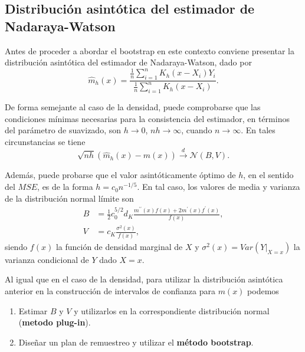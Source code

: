 \documentclass[
]{book}
\theoremstyle{break}
\theoremstyle{definition}
\theoremstyle{definition}
\theoremstyle{definition}
\theoremstyle{definition}
\theoremstyle{remark}
\begin{document}
\hypertarget{distribuciuxf3n-asintuxf3tica-del-estimador-de-nadaraya-watson}{%
\subsection{Distribución asintótica del estimador de Nadaraya-Watson}\label{distribuciuxf3n-asintuxf3tica-del-estimador-de-nadaraya-watson}}

Antes de proceder a abordar el bootstrap en este contexto conviene
presentar la distribución asintótica del estimador de Nadaraya-Watson,
dado por
\[\hat{m}_{h}\left( x \right) =\frac{\frac{1}{n}\sum_{i=1}^{n}K_{h}\left(
x-X_i \right) Y_i}{\frac{1}{n}\sum_{i=1}^{n}K_{h}\left( x-X_i \right)}.\]

De forma semejante al caso de la densidad, puede comprobarse que las
condiciones mínimas necesarias para la consistencia del estimador, en
términos del parámetro de suavizado, son \(h\rightarrow 0\),
\(nh\rightarrow \infty\), cuando \(n\rightarrow \infty\). En tales
circunstancias se tiene
\[\sqrt{nh}\left( \hat{m}_{h}\left( x \right) -m\left( x \right) \right) \overset
{d}{\rightarrow }\mathcal{N}\left( B,V \right) \text{.}\]

Además, puede probarse que el valor asintóticamente óptimo de \(h\), en el
sentido del \(MSE\), es de la forma \(h=c_{0}n^{-1/5}\). En tal caso, los
valores de media y varianza de la distribución normal límite son
\[\begin{aligned}
B &= \frac{1}{2}c_{0}^{5/2}d_{K}\frac{m^{\prime \prime }\left( x \right)
f\left( x \right) +2m^{\prime}\left( x \right) f^{\prime}\left( x \right)}{
f\left( x \right)}, \\
V &= c_{K}\frac{\sigma^2\left( x \right)}{f\left( x \right)},
\end{aligned}\]
siendo \(f\left( x \right)\) la función de densidad marginal de \(X\) y
\(\sigma^2\left( x \right) =Var\left( \left. Y\right\vert _{X=x} \right)\)
la varianza condicional de \(Y\) dado \(X=x\).

Al igual que en el caso de la densidad, para utilizar la distribución
asintótica anterior en la construcción de intervalos de confianza para
\(m\left( x \right)\) podemos

\begin{enumerate}
\def\labelenumi{\arabic{enumi}.}
\item
  Estimar \(B\) y \(V\) y utilizarlos en la correspondiente distribución
  normal (\textbf{metodo plug-in}).
\item
  Diseñar un plan de remuestreo y utilizar el \textbf{método bootstrap}.
\end{enumerate}
\end{document}
